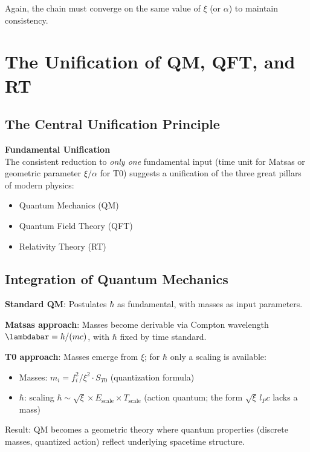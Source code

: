 	Again, the chain must converge on the same value of $\xi$ (or $\alpha$) to maintain consistency.
	
	\section{The Unification of QM, QFT, and RT}
	
	\subsection{The Central Unification Principle}
	
	\begin{keyresult}
		\textbf{Fundamental Unification}\\
		The consistent reduction to \emph{only one} fundamental input (time unit for Matsas or geometric parameter $\xi/\alpha$ for T0) suggests a unification of the three great pillars of modern physics:
		\begin{itemize}
			\item Quantum Mechanics (QM)
			\item Quantum Field Theory (QFT)
			\item Relativity Theory (RT)
		\end{itemize}
	\end{keyresult}
	
	\subsection{Integration of Quantum Mechanics}
	
	\textbf{Standard QM}: Postulates $\hbar$ as fundamental, with masses as input parameters.
	
	\textbf{Matsas approach}: Masses become derivable via Compton wavelength $\lambdabar = \hbar/(mc)$, with $\hbar$ fixed by time standard.
	
	\textbf{T0 approach}: Masses emerge from $\xi$; for $\hbar$ only a scaling is available:
	\begin{itemize}
		\item Masses: $m_i = f_i^2 / \xi^2 \cdot S_{T0}$ (quantization formula)
		\item $\hbar$: scaling $\hbar \sim \sqrt{\xi} \times E_{\text{scale}} \times T_{\text{scale}}$ (action quantum; the form $\sqrt{\xi}\, l_P c$ lacks a mass)
	\end{itemize}
	
	Result: QM becomes a geometric theory where quantum properties (discrete masses, quantized action) reflect underlying spacetime structure.
	
